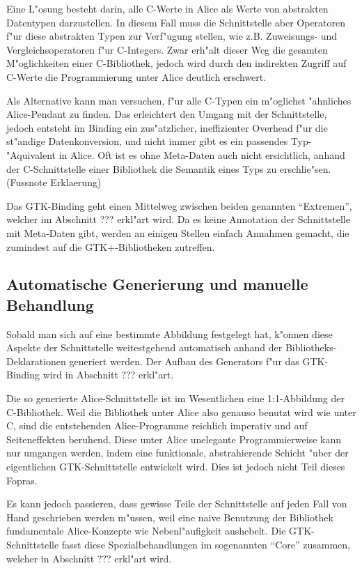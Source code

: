\documentclass{article}
\begin{document}
Eine L"osung besteht darin, alle C-Werte in Alice als Werte von abstrakten
Datentypen darzustellen. In diesem Fall muss die Schnittstelle aber Operatoren
f"ur diese abstrakten Typen zur Verf"ugung stellen, wie z.B. Zuweisungs- und
Vergleichsoperatoren f"ur C-Integers.
Zwar erh"alt dieser Weg die gesamten M"oglichkeiten einer C-Bibliothek,
jedoch wird durch den indirekten Zugriff auf C-Werte die Programmierung
unter Alice deutlich erschwert.

Als Alternative kann man versuchen, f"ur alle C-Typen ein m"oglichst
"ahnliches Alice-Pendant zu finden. Das erleichtert den Umgang mit der
Schnittstelle, jedoch entsteht im Binding ein zus"atzlicher, ineffizienter
Overhead f"ur die st"andige Datenkonversion, und nicht immer gibt es
ein passendes Typ-"Aquivalent in Alice. Oft ist es ohne Meta-Daten auch nicht
ersichtlich, anhand der C-Schnittstelle einer Bibliothek die Semantik eines
Typs zu erschlie"sen. (Fussnote Erklaerung)

Das GTK-Binding geht einen Mittelweg zwischen beiden genannten ``Extremen'',
welcher im Abschnitt ??? erkl"art wird.
Da es keine Annotation der Schnittstelle mit Meta-Daten gibt, werden an einigen
Stellen einfach Annahmen gemacht, die zumindest auf die GTK+-Bibliotheken
zutreffen.

\subsection{Automatische Generierung und manuelle Behandlung}

Sobald man sich auf eine bestimmte Abbildung festgelegt hat, k"onnen diese
Aspekte der Schnittstelle weitestgehend automatisch anhand der Bibliotheks-
Deklarationen generiert werden. Der Aufbau des Generators f"ur das GTK-Binding
wird in Abschnitt ??? erkl"art.

Die so generierte Alice-Schnittstelle ist im Wesentlichen eine 1:1-Abbildung
der C-Bibliothek. Weil die Bibliothek unter Alice also genauso benutzt wird
wie unter C, sind die entstehenden Alice-Programme reichlich imperativ und auf
Seiteneffekten beruhend. Diese unter Alice unelegante Programmierweise kann
nur umgangen werden, indem eine funktionale, abstrahierende Schicht "uber der
eigentlichen GTK-Schnittstelle entwickelt wird. Dies ist jedoch nicht Teil
dieses Fopras.

Es kann jedoch passieren, dass gewisse Teile der Schnittstelle auf jeden Fall
von Hand geschrieben werden m"ussen, weil eine naive Benutzung der Bibliothek
fundamentale Alice-Konzepte wie Nebenl"aufigkeit aushebelt. Die
GTK-Schnittstelle fasst diese Spezialbehandlungen im sogenannten ``Core''
zusammen, welcher in Abschnitt ??? erkl"art wird.
\end{document}
